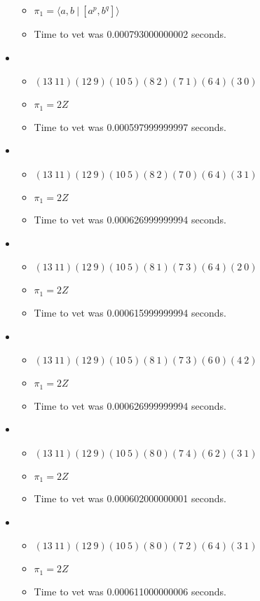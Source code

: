 \documentclass{article}
\begin{document}
\begin{itemize}
\begin{itemize}
      \item $\pi_1 = \langle a,b\ |\ [a^p,b^q]\rangle$
      \item Time to vet was 0.000793000000002 seconds.
\end{itemize}
\item \begin{itemize}
      \item $(13\ 11)(12\ 9)(10\ 5)(8\ 2)(7\ 1)(6\ 4)(3\ 0)$
      \item $\pi_1 =2 Z$
      \item Time to vet was 0.000597999999997 seconds.
\end{itemize}
\item \begin{itemize}
      \item $(13\ 11)(12\ 9)(10\ 5)(8\ 2)(7\ 0)(6\ 4)(3\ 1)$
      \item $\pi_1 =2 Z$
      \item Time to vet was 0.000626999999994 seconds.
\end{itemize}
\item \begin{itemize}
      \item $(13\ 11)(12\ 9)(10\ 5)(8\ 1)(7\ 3)(6\ 4)(2\ 0)$
      \item $\pi_1 =2 Z$
      \item Time to vet was 0.000615999999994 seconds.
\end{itemize}
\item \begin{itemize}
      \item $(13\ 11)(12\ 9)(10\ 5)(8\ 1)(7\ 3)(6\ 0)(4\ 2)$
      \item $\pi_1 =2 Z$
      \item Time to vet was 0.000626999999994 seconds.
\end{itemize}
\item \begin{itemize}
      \item $(13\ 11)(12\ 9)(10\ 5)(8\ 0)(7\ 4)(6\ 2)(3\ 1)$
      \item $\pi_1 =2 Z$
      \item Time to vet was 0.000602000000001 seconds.
\end{itemize}
\item \begin{itemize}
      \item $(13\ 11)(12\ 9)(10\ 5)(8\ 0)(7\ 2)(6\ 4)(3\ 1)$
      \item $\pi_1 =2 Z$
      \item Time to vet was 0.000611000000006 seconds.

\end{itemize}
\end{itemize}
\end{document}

